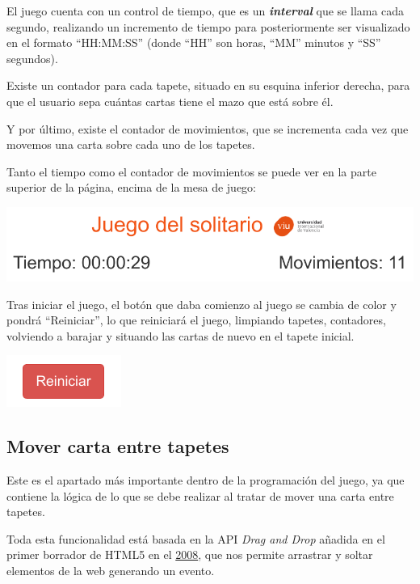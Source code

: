 \documentclass{\ClassPath/viu-tfm-template}
\begin{document}
El juego cuenta con un control de tiempo, que es un \textit{\textbf{interval}} que se llama cada segundo, realizando un incremento de tiempo para posteriormente ser visualizado en el formato “HH:MM:SS” (donde “HH” son horas, “MM” minutos y “SS” segundos).

Existe un contador para cada tapete, situado en su esquina inferior derecha, para que el usuario sepa cuántas cartas tiene el mazo que está sobre él.

Y por último, existe el contador de movimientos, que se incrementa cada vez que movemos una carta sobre cada uno de los tapetes.

Tanto el tiempo como el contador de movimientos se puede ver en la parte superior de la página, encima de la mesa de juego:

\vspace{-1em}
\begin{center}
    \includegraphics[frame,width=0.8\linewidth]{img/cabecera.png}
\end{center}
\vspace{-1em}

Tras iniciar el juego, el botón que daba comienzo al juego se cambia de color y pondrá “Reiniciar”, lo que reiniciará el juego, limpiando tapetes, contadores, volviendo a barajar y situando las cartas de nuevo en el tapete inicial.

\vspace{-1.6em}
\begin{center}
    \includegraphics[width=0.2\linewidth]{img/reiniciar.png}
\end{center}
\vspace{-1em}


\subsection{Mover carta entre tapetes}
Este es el apartado más importante dentro de la programación del juego, ya que contiene la lógica de lo que se debe realizar al tratar de mover una carta entre tapetes.

Toda esta funcionalidad está basada en la API \textit{Drag and Drop} añadida en el primer borrador de HTML5 en el \href{https://www.w3.org/TR/2008/WD-html5-20080122/#dnd}{2008}, que nos permite arrastrar y soltar elementos de la web generando un evento.
\end{document}

